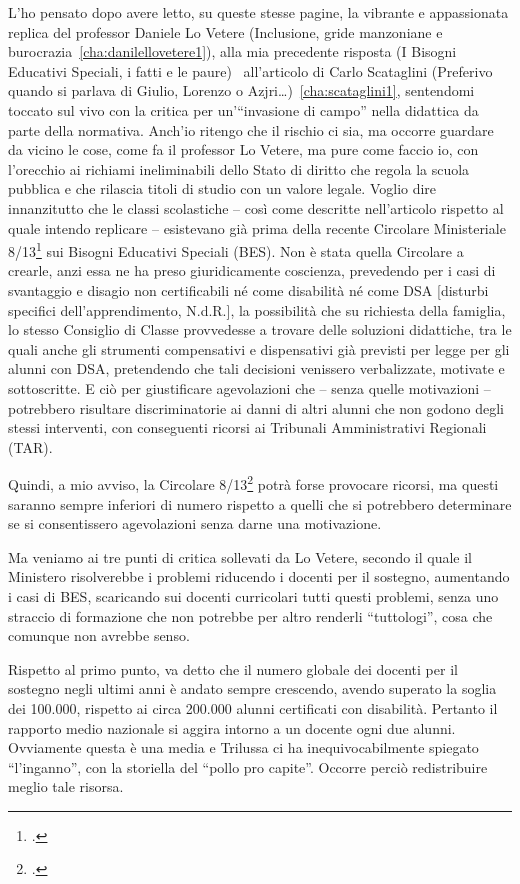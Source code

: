 L'ho pensato dopo avere letto, su queste stesse pagine, la vibrante e appassionata replica del professor Daniele Lo Vetere (Inclusione, gride manzoniane e burocrazia~\ref{cha:danilellovetere1}), alla mia precedente risposta (I Bisogni Educativi Speciali, i fatti e le paure)~\pageref{cha:nocera030613} all'articolo di Carlo Scataglini (Preferivo quando si parlava di Giulio, Lorenzo o Azjri…)~\ref{cha:scataglini1}, sentendomi toccato sul vivo con la critica per un'“invasione di campo” nella didattica da parte della normativa. Anch'io ritengo che il rischio ci sia, ma occorre guardare da vicino le cose, come fa il professor Lo Vetere, ma pure come faccio io, con l'orecchio ai richiami ineliminabili dello Stato di diritto che regola la scuola pubblica e che rilascia titoli di studio con un valore legale.
Voglio dire innanzitutto che le classi scolastiche – così come descritte nell'articolo rispetto al quale intendo replicare – esistevano già prima della recente Circolare Ministeriale 8/13\footcite{cm8_2013} sui Bisogni Educativi Speciali (BES). Non è stata quella Circolare a crearle, anzi essa ne ha preso giuridicamente coscienza, prevedendo per i casi di svantaggio e disagio non certificabili né come disabilità né come DSA [disturbi specifici dell'apprendimento, N.d.R.], la possibilità che su richiesta della famiglia, lo stesso Consiglio di Classe provvedesse a trovare delle soluzioni didattiche, tra le quali anche gli strumenti compensativi e dispensativi già previsti per legge per gli alunni con DSA, pretendendo che tali decisioni venissero verbalizzate, motivate e sottoscritte. E ciò per giustificare agevolazioni che – senza quelle motivazioni – potrebbero risultare discriminatorie ai danni di altri alunni che non godono degli stessi interventi, con conseguenti ricorsi ai Tribunali Amministrativi Regionali (TAR).

Quindi, a mio avviso, la Circolare 8/13\footcite{cm8_2013} potrà forse provocare ricorsi, ma questi saranno sempre inferiori di numero rispetto a quelli che si potrebbero determinare se si consentissero agevolazioni senza darne una motivazione.

Ma veniamo ai tre punti di critica sollevati da Lo Vetere, secondo il quale il Ministero risolverebbe i problemi riducendo i docenti per il sostegno, aumentando i casi di BES, scaricando sui docenti curricolari tutti questi problemi, senza uno straccio di formazione che non potrebbe per altro renderli “tuttologi”, cosa che comunque non avrebbe senso.

Rispetto al primo punto, va detto che il numero globale dei docenti per il sostegno negli ultimi anni è andato sempre crescendo, avendo superato la soglia dei 100.000, rispetto ai circa 200.000 alunni certificati con disabilità. Pertanto il rapporto medio nazionale si aggira intorno a un docente ogni due alunni. Ovviamente questa è una media e Trilussa ci ha inequivocabilmente spiegato “l'inganno”, con la storiella del “pollo pro capite”. Occorre perciò redistribuire meglio tale risorsa.

